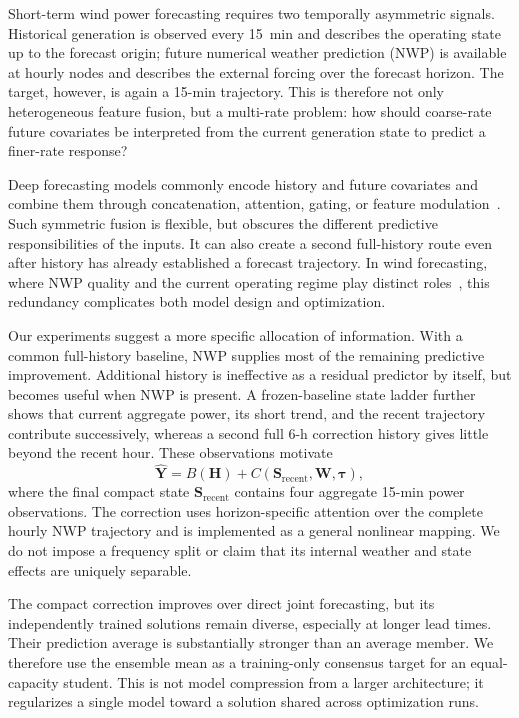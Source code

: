 \documentclass[conference]{IEEEtran}
\begin{document}
Short-term wind power forecasting requires two temporally asymmetric signals. Historical generation is observed every 15~min and describes the operating state up to the forecast origin; future numerical weather prediction (NWP) is available at hourly nodes and describes the external forcing over the forecast horizon. The target, however, is again a 15-min trajectory. This is therefore not only heterogeneous feature fusion, but a multi-rate problem: how should coarse-rate future covariates be interpreted from the current generation state to predict a finer-rate response?

Deep forecasting models commonly encode history and future covariates and combine them through concatenation, attention, gating, or feature modulation~\cite{ref_review,ref_attention,ref_tft,ref_film}. Such symmetric fusion is flexible, but obscures the different predictive responsibilities of the inputs. It can also create a second full-history route even after history has already established a forecast trajectory. In wind forecasting, where NWP quality and the current operating regime play distinct roles~\cite{ref_pinson,ref_nwp_nature}, this redundancy complicates both model design and optimization.

Our experiments suggest a more specific allocation of information. With a common full-history baseline, NWP supplies most of the remaining predictive improvement. Additional history is ineffective as a residual predictor by itself, but becomes useful when NWP is present. A frozen-baseline state ladder further shows that current aggregate power, its short trend, and the recent trajectory contribute successively, whereas a second full 6-h correction history gives little beyond the recent hour. These observations motivate
\begin{equation}
    \hat{\mathbf Y}=B(\mathbf H)+C(\mathbf S_{\mathrm{recent}},\mathbf W,\boldsymbol\tau),
    \label{eq:main}
\end{equation}
where the final compact state $\mathbf S_{\mathrm{recent}}$ contains four aggregate 15-min power observations. The correction uses horizon-specific attention over the complete hourly NWP trajectory and is implemented as a general nonlinear mapping. We do not impose a frequency split or claim that its internal weather and state effects are uniquely separable.

The compact correction improves over direct joint forecasting, but its independently trained solutions remain diverse, especially at longer lead times. Their prediction average is substantially stronger than an average member. We therefore use the ensemble mean as a training-only consensus target for an equal-capacity student. This is not model compression from a larger architecture; it regularizes a single model toward a solution shared across optimization runs.
\end{document}
